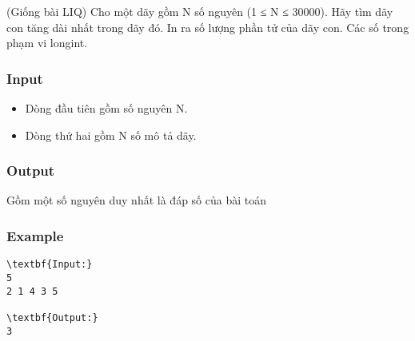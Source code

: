 



   (Giống bài LIQ) Cho một dãy gồm N số nguyên (1 ≤ N ≤ 30000). Hãy tìm dãy con tăng dài nhất trong dãy đó. In ra số lượng phần tử của dãy con. Các số trong phạm vi longint.  

\subsubsection{   Input  }
\begin{itemize}
	\item     Dòng đầu tiên gồm số nguyên N.   
	\item     Dòng thứ hai gồm N số mô tả dãy.   
\end{itemize}

\subsubsection{   Output  }

   Gồm một số nguyên duy nhất là đáp số của bài toán  

\subsubsection{   Example  }
\begin{verbatim}
\textbf{Input:}
5
2 1 4 3 5

\textbf{Output:}
3
\end{verbatim}